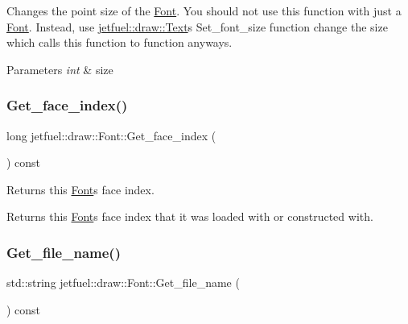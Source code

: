 Changes the point size of the \hyperlink{classjetfuel_1_1draw_1_1Font}{Font}. You should not use this function with just a \hyperlink{classjetfuel_1_1draw_1_1Font}{Font}. Instead, use \hyperlink{classjetfuel_1_1draw_1_1Text}{jetfuel\+::draw\+::\+Text}\textquotesingle{}s Set\+\_\+font\+\_\+size function change the size which calls this function to function anyways.


\begin{DoxyParams}{Parameters}
{\em int} & size \\
\hline
\end{DoxyParams}
\mbox{\label{classjetfuel_1_1draw_1_1Font_ad0f24c27c3dcca9839e4ffc1603a1c54}} 
\subsubsection{\texorpdfstring{Get\+\_\+face\+\_\+index()}{Get\_face\_index()}}
{\footnotesize\ttfamily long jetfuel\+::draw\+::\+Font\+::\+Get\+\_\+face\+\_\+index (\begin{DoxyParamCaption}{ }\end{DoxyParamCaption}) const\hspace{0.3cm}{\ttfamily [inline]}}



Returns this \hyperlink{classjetfuel_1_1draw_1_1Font}{Font}\textquotesingle{}s face index. 

Returns this \hyperlink{classjetfuel_1_1draw_1_1Font}{Font}\textquotesingle{}s face index that it was loaded with or constructed with. \mbox{\label{classjetfuel_1_1draw_1_1Font_a497ce6fb60f71fdc8667c5a5ede81cca}} 
\subsubsection{\texorpdfstring{Get\+\_\+file\+\_\+name()}{Get\_file\_name()}}
{\footnotesize\ttfamily std\+::string jetfuel\+::draw\+::\+Font\+::\+Get\+\_\+file\+\_\+name (\begin{DoxyParamCaption}{ }\end{DoxyParamCaption}) const\hspace{0.3cm}{\ttfamily [inline]}}



